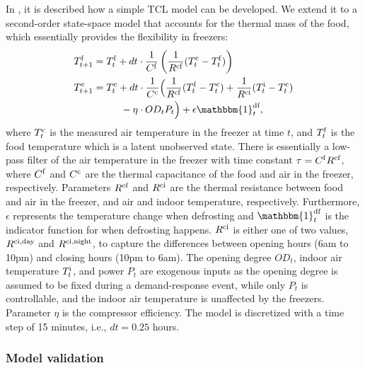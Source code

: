 In \cite{hao2014aggregate}, it is described how a simple TCL model can be developed. We extend it to a second-order state-space model that accounts for the thermal mass of the food, which essentially provides the flexibility in freezers:
%
\begin{subequations}\label{eq:2ndFreezerStateSpace}
    \begin{align}
        T^{\rm{f}}_{t+1} & = T^{\rm{f}}_{t} + dt \cdot \frac{1}{C^{\rm{f}}}\left(\frac{1}{R^{\rm{cf}}} (T^{\rm{c}}_{t} - T^{\rm{f}}_{t}) \right)                                                                                         \\
        T^{\rm{c}}_{t+1} & = T^{\rm{c}}_t + dt \cdot \frac{1}{C^{\rm{c}}}\Bigl(\frac{1}{R^{\rm{cf}}} (T^{\rm{f}}_t - T^{\rm{c}}_t) + \frac{1}{R^{\rm{ci}}} (T^{\rm{i}}_t - T^{\rm{c}}_t)                                          \notag \\ & \mspace{50mu} - \eta \cdot OD_t P_t \Bigr) + \epsilon \mathbbm{1}^{\text{df}}_{t},
    \end{align}
\end{subequations}
%
where $T^{\rm{c}}_t$ is the measured air temperature in the freezer at time $t$, and $T^{\rm{f}}_t$ is the food temperature which is a latent unobserved state. There is essentially a low-pass filter of the air temperature in the freezer with time constant $\tau = C^{\rm{f}} R^{\rm{cf}}$, where $C^{\rm{f}}$ and $C^{\rm{c}}$ are the thermal capacitance of the food and air in the freezer, respectively. Parameters $R^{\rm{cf}}$ and $R^{\rm{ci}}$ are the thermal resistance between food and air in the freezer, and air and indoor temperature, respectively. Furthermore, $\epsilon$ represents the temperature change when defrosting and $\mathbbm{1}^{\text{df}}_{t}$ is the indicator function for when defrosting happens. $R^{\rm{ci}}$ is either one of two values, $R^{\rm{ci}, \text{day}}$ and $R^{\rm{ci}, \text{night}}$, to capture the differences between opening hours (6am to 10pm) and closing hours (10pm to 6am). The opening degree $OD_t$, indoor air temperature $T^{\rm{i}}_t$, and power $P_t$ are exogenous inputs as the opening degree is assumed to be fixed during a demand-response event, while only $P_t$ is controllable, and the indoor air temperature is unaffected by the freezers. Parameter $\eta$ is the compressor efficiency. The model is discretized with a time step of 15 minutes, i.e., $dt = 0.25$ hours. 

\subsubsection{Model validation}

